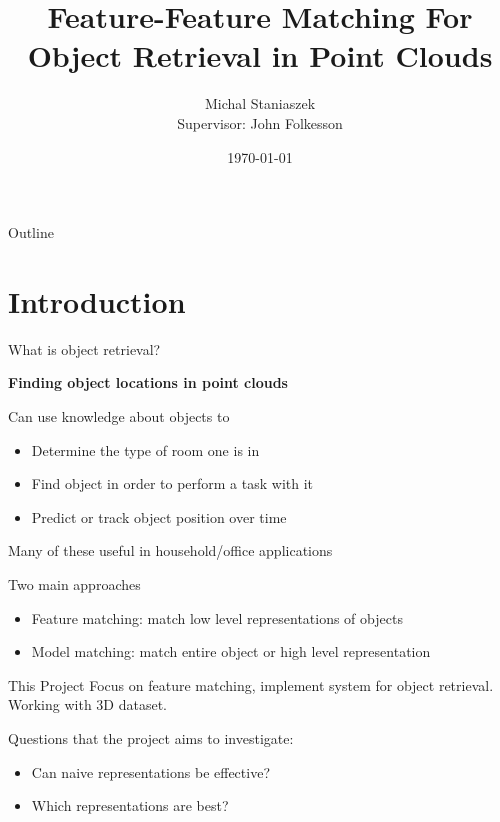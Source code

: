 \documentclass{beamer}
\title[Object Retrieval]
{Feature-Feature Matching For Object Retrieval in Point Clouds}
\author[Michal Staniaszek]{\large{Michal Staniaszek} \\
  \scriptsize{Supervisor: John Folkesson}}
\institute[KTH]{Royal Institute of Technology}
\date{\today}
\begin{document}
\begin{frame}
  \titlepage
\end{frame}

\begin{frame}{Outline}
  \tableofcontents
\end{frame}

\section{Introduction}
\begin{frame}{What is object retrieval?}
  \begin{center}
    \textbf{Finding object locations in point clouds}
  \end{center}
  \vspace{0.25cm}
  Can use knowledge about objects to
  \begin{itemize}
  \item Determine the type of room one is in
  \item Find object in order to perform a task with it
  \item Predict or track object position over time
  \end{itemize}
  Many of these useful in household/office applications
  
  \vspace{0.25cm}
  Two main approaches
  \begin{itemize}
  \item Feature matching: match low level representations of objects
  \item Model matching: match entire object or high level representation
  \end{itemize}
\end{frame}
\begin{frame}{This Project}
  Focus on feature matching, implement system for object retrieval. Working with
  3D dataset.
  
  \vspace{0.5cm}
  Questions that the project aims to investigate:
  \begin{itemize}
  \item Can naive representations be effective?
  \item Which representations are best?
  \end{itemize}
\end{frame}
\end{document}

